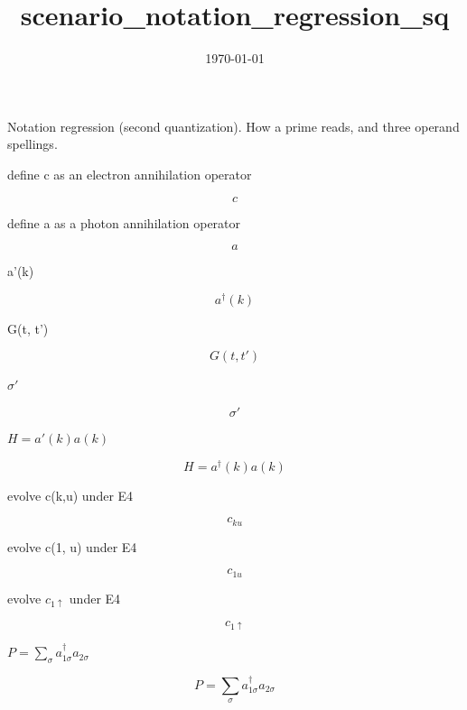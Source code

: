 \documentclass[dvipdfmx]{article}
\title{scenario\_notation\_regression\_sq}
\date{\today}
\begin{document}
\maketitle

Notation regression (second quantization). How a prime reads, and three operand spellings.

define c as an electron annihilation operator

\[
  c
\]

define a as a photon annihilation operator

\[
  a
\]

a'(k)

\begin{equation}
  a^{\dagger}(k)
  \label{eq:E1}
\end{equation}

G(t, t')

\begin{equation}
  G(t, t')
  \label{eq:E2}
\end{equation}

$\sigma'$

\begin{equation}
  \sigma'
  \label{eq:E3}
\end{equation}

$H = a'(k) a(k)$

\begin{equation}
  H = a^{\dagger}(k) a(k)
  \label{eq:E4}
\end{equation}

evolve c(k,u) under E4

\begin{equation}
  c_{ku}
  \label{eq:E5}
\end{equation}

evolve c(1, u) under E4

\begin{equation}
  c_{1u}
  \label{eq:E6}
\end{equation}

evolve $c_{1\uparrow}$ under E4

\begin{equation}
  c_{1\uparrow}
  \label{eq:E7}
\end{equation}

$P = \sum_\sigma a^\dagger_{1\sigma} a_{2\sigma}$

\begin{equation}
  P = \sum_\sigma a^\dagger_{1\sigma} a_{2\sigma}
  \label{eq:E8}
\end{equation}
\end{document}
